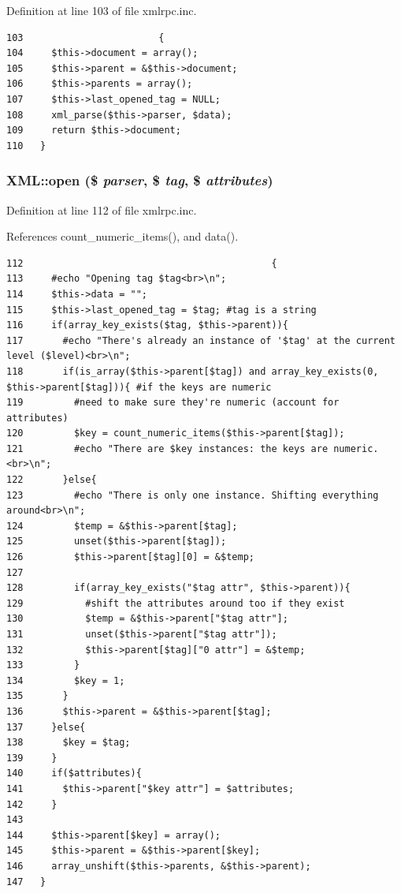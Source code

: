Definition at line 103 of file xmlrpc.inc.

\begin{Code}\begin{verbatim}103                        {
104     $this->document = array();
105     $this->parent = &$this->document;
106     $this->parents = array();
107     $this->last_opened_tag = NULL;
108     xml_parse($this->parser, $data);
109     return $this->document;
110   }
\end{verbatim}
\end{Code}


\hypertarget{classXML_eac7eae74d866d4f5a0cdb9be27ff279}{
\subsubsection{\setlength{\rightskip}{0pt plus 5cm}XML::open (\$ {\em parser}, \$ {\em tag}, \$ {\em attributes})}}
\label{classXML_eac7eae74d866d4f5a0cdb9be27ff279}




Definition at line 112 of file xmlrpc.inc.

References count\_\-numeric\_\-items(), and data().

\begin{Code}\begin{verbatim}112                                            {
113     #echo "Opening tag $tag<br>\n";
114     $this->data = "";
115     $this->last_opened_tag = $tag; #tag is a string
116     if(array_key_exists($tag, $this->parent)){
117       #echo "There's already an instance of '$tag' at the current level ($level)<br>\n";
118       if(is_array($this->parent[$tag]) and array_key_exists(0, $this->parent[$tag])){ #if the keys are numeric
119         #need to make sure they're numeric (account for attributes)
120         $key = count_numeric_items($this->parent[$tag]);
121         #echo "There are $key instances: the keys are numeric.<br>\n";
122       }else{
123         #echo "There is only one instance. Shifting everything around<br>\n";
124         $temp = &$this->parent[$tag];
125         unset($this->parent[$tag]);
126         $this->parent[$tag][0] = &$temp;
127 
128         if(array_key_exists("$tag attr", $this->parent)){
129           #shift the attributes around too if they exist
130           $temp = &$this->parent["$tag attr"];
131           unset($this->parent["$tag attr"]);
132           $this->parent[$tag]["0 attr"] = &$temp;
133         }
134         $key = 1;
135       }
136       $this->parent = &$this->parent[$tag];
137     }else{
138       $key = $tag;
139     }
140     if($attributes){
141       $this->parent["$key attr"] = $attributes;
142     }
143 
144     $this->parent[$key] = array();
145     $this->parent = &$this->parent[$key];
146     array_unshift($this->parents, &$this->parent);
147   }
\end{verbatim}
\end{Code}




